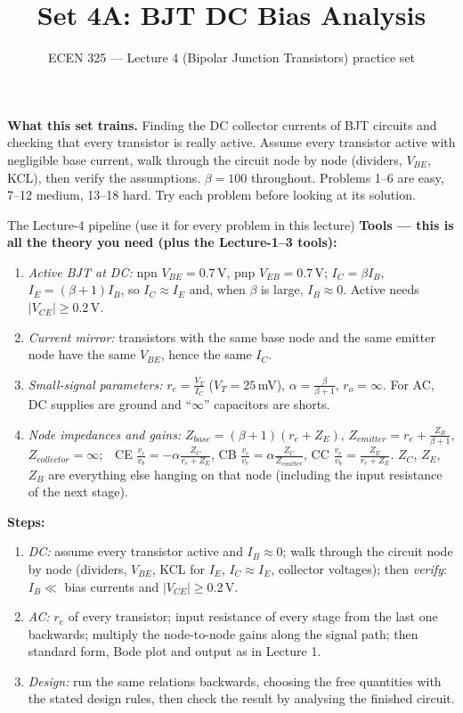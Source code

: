 \documentclass[11pt]{article}
\title{Set 4A: BJT DC Bias Analysis}
\author{ECEN 325 --- Lecture 4 (Bipolar Junction Transistors) practice set}
\date{}
\begin{document}
\maketitle

\textbf{What this set trains.} Finding the DC collector currents of BJT circuits and checking that every transistor
is really active. Assume every transistor active with negligible base current, walk through the circuit node by node
(dividers, $V_{BE}$, KCL), then verify the assumptions. $\beta = 100$ throughout. Problems 1--6 are easy, 7--12
medium, 13--18 hard. Try each problem before looking at its solution.


\begin{cardbox}{The Lecture-4 pipeline (use it for every problem in this lecture)}
\textbf{Tools --- this is all the theory you need (plus the Lecture-1--3 tools):}
\begin{enumerate}[label=\textbf{T\arabic*},leftmargin=2.2em,itemsep=1pt]
\item \emph{Active BJT at DC:} npn $V_{BE}=0.7$\,V, pnp $V_{EB}=0.7$\,V; $I_C=\beta I_B$, $I_E=(\beta+1)I_B$, so
      $I_C\approx I_E$ and, when $\beta$ is large, $I_B\approx 0$. Active needs $|V_{CE}|\ge 0.2$\,V.
\item \emph{Current mirror:} transistors with the same base node and the same emitter node have the same $V_{BE}$,
      hence the same $I_C$.
\item \emph{Small-signal parameters:} $r_e = \frac{V_T}{I_C}$ ($V_T=25$\,mV), $\alpha=\frac{\beta}{\beta+1}$, $r_o=\infty$.
      For AC, DC supplies are ground and ``$\infty$'' capacitors are shorts.
\item \emph{Node impedances and gains:} $Z_{base}=(\beta+1)(r_e+Z_E)$, $Z_{emitter}=r_e+\frac{Z_B}{\beta+1}$,
      $Z_{collector}=\infty$;\ \ CE $\frac{v_c}{v_b}=-\alpha\frac{Z_C}{r_e+Z_E}$, CB $\frac{v_c}{v_e}=\alpha\frac{Z_C}{Z_{emitter}}$,
      CC $\frac{v_e}{v_b}=\frac{Z_E}{r_e+Z_E}$. $Z_C$, $Z_E$, $Z_B$ are everything else hanging on that node
      (including the input resistance of the next stage).
\end{enumerate}
\textbf{Steps:}
\begin{enumerate}[leftmargin=2.2em,itemsep=1pt]
\item \emph{DC:} assume every transistor active and $I_B\approx0$; walk through the circuit node by node
      (dividers, $V_{BE}$, KCL for $I_E$, $I_C\approx I_E$, collector voltages); then \emph{verify}: $I_B\ll$ bias currents and
      $|V_{CE}|\ge0.2$\,V.
\item \emph{AC:} $r_e$ of every transistor; input resistance of every stage from the last one backwards; multiply the
      node-to-node gains along the signal path; then standard form, Bode plot and output as in Lecture 1.
\item \emph{Design:} run the same relations backwards, choosing the free quantities with the stated design rules, then
      check the result by analysing the finished circuit.
\end{enumerate}
\end{cardbox}
\end{document}
